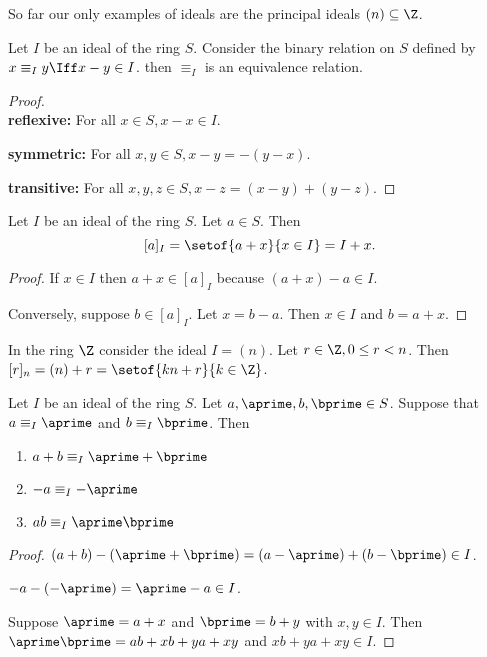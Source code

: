 \documentclass[oneside,12pt]{amsart}
\begin{document}
So far our only examples of ideals are the principal ideals $(n) \subseteq \Z$.

\begin{lemma}
Let $I$ be an ideal of the ring $S$. Consider the binary relation on $S$ defined by $x\equiv_I y \Iff x - y \in I$.
then $\equiv_I$ is an equivalence relation.
\end{lemma}
\begin{proof} \quad \\

\textbf{reflexive:} For all $x\in S, x-x\in I$.

\textbf{symmetric:} For all $x,y\in S, x-y = -(y-x)$.

\textbf{transitive:} For all $x,y,z\in S, x-z=(x-y)+(y-z)$.
\end{proof}

\begin{lemma}
Let $I$ be an ideal of the ring $S$. Let $a\in S$. Then
$$[a]_I=\setof{a+x}{x\in I} = I+x.$$
\end{lemma}
\begin{proof}
If $x\in I$ then $a+x\in [a]_I$ because $(a+x)-a \in I$.

Conversely, suppose $b\in [a]_I$. Let $x=b-a$. Then $x\in I$ and $b=a+x$.
\end{proof}

\begin{example}
In the ring $\Z$ consider the ideal $I=(n)$. Let $r\in\Z, 0\leq r < n$. Then 
$[r]_n = (n) + r = \setof{kn+r}{k\in\Z}$.
\end{example}


\begin{lemma}
\label{RingOperationsCompatibleWithIdeals}
Let $I$ be an ideal of the ring $S$. Let $a,\aprime,b,\bprime\in S$. Suppose that $a\equiv_I\aprime$ and $b\equiv_I\bprime$.
Then
\begin{enumerate}
\item $a+b\equiv_I \aprime+\bprime$
\item $-a\equiv_I -\aprime$
\item $ab \equiv_I \aprime\bprime$
\end{enumerate}
\end{lemma}
\begin{proof}
$(a+b)-(\aprime+\bprime)=(a-\aprime)+(b-\bprime) \in I$.

$-a - (-\aprime) = \aprime-a \in I$.

Suppose $\aprime = a + x$ and $\bprime = b + y$ with $x,y\in I$. Then
$\aprime\bprime = ab +xb + ya + xy$ and $xb + ya + xy \in I$.
\end{proof}
\end{document}
